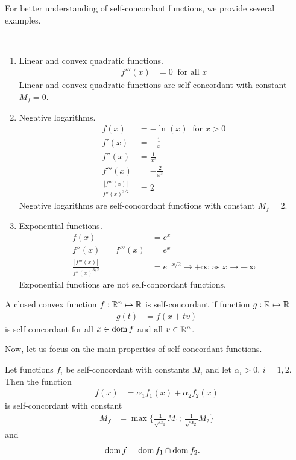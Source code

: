 For better understanding of self-concordant functions, we provide several examples.

\begin{example}~
  \begin{enumerate}
    \item Linear and convex quadratic functions.
      \begin{align}
        f'''(x) &= 0\ \text{ for all } x
      \end{align}
      Linear and convex quadratic functions are self-concordant with constant $M_f = 0$.
    \item Negative logarithms.
      \begin{align}
        f(x) &= -\ln(x)\ \text{ for } x>0\\
        f'(x) &= -\frac{1}{x}\\
        f''(x) &= \frac{1}{x^2}\\
        f'''(x) &= -\frac{2}{x^3}\\
        \frac{|f'''(x)|}{f''(x)^{3/2}} &= 2
      \end{align}
      Negative logarithms are self-concordant functions with constant $M_f = 2$.

    \item Exponential functions.
      \begin{align}
        f(x) &= e^x\\
        f''(x) \ =\ f'''(x) &= e^x\\
        \frac{|f'''(x)|}{f''(x)^{3/2}} &= e^{-x/2} \rightarrow+\infty \text{ as } x\rightarrow-\infty
      \end{align}
      Exponential functions are not self-concordant functions.
  \end{enumerate}
\end{example}

\begin{definition}
  A closed convex function $f: \mathbb{R}^n \mapsto \mathbb{R}$ is self-concordant if function $g: \mathbb{R} \mapsto \mathbb{R}$
  \begin{align}
    g(t) &= f(x + tv)
  \end{align}
  is self-concordant for all $x\in\operatorname{dom} f$ and all $v\in\mathbb{R}^n$.
\end{definition}

Now, let us focus on the main properties of self-concordant functions.

\begin{theorem}
  Let functions $f_i$ be self-concordant with constants $M_i$  and let $\alpha_i > 0$, $i = 1,2$. Then the function
 \begin{align}
   f(x) &= \alpha_1f_1(x) + \alpha_2f_2(x)
 \end{align}
 is self-concordant with constant
 \begin{align}
   M_f &= \max \bigg\{\frac{1}{\sqrt{\alpha_1}}M_1;\ \frac{1}{\sqrt{\alpha_2}}M_2\bigg\}
 \end{align}
 and
 \begin{align}
   \operatorname{dom} f &= \operatorname{dom} f_1 \cap \operatorname{dom} f_2.
 \end{align}
\end{theorem}


